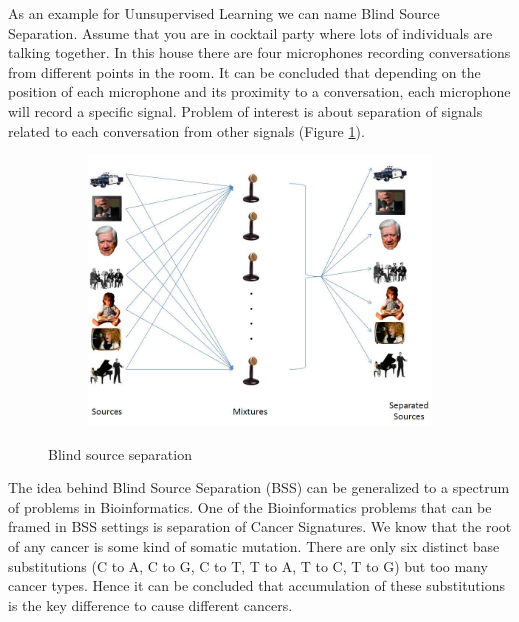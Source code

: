 \documentclass[12pt]{article}
\begin{document}
As an example for Uunsupervised Learning we can name Blind Source Separation. Assume that you are in cocktail party where lots of individuals are talking together. In this house there are four microphones recording conversations from different points in the room. It can be concluded that depending on the position of each microphone and its proximity to a conversation, each microphone will record a specific signal. Problem of interest is about separation of signals related to each conversation from other signals (Figure \ref{fig:bss}).
\begin{figure}[h!]
  \centering  
  \begin{subfigure}[b]{0.4\linewidth}
    \includegraphics[width=\linewidth]{./images/bss.jpg}
  \end{subfigure}
  \caption{Blind source separation}
  \label{fig:bss}
\end{figure}

The idea behind Blind Source Separation (BSS) can be generalized to a spectrum of problems in Bioinformatics. One of the Bioinformatics problems that can be framed in BSS settings is separation of Cancer Signatures. We know that the root of any cancer is some kind of somatic mutation. There are only six distinct base substitutions (C to A, C to G, C to T, T to A, T to C, T to G) but too many cancer types. Hence it can be concluded that accumulation of these substitutions is the key difference to cause different cancers.
\end{document}
